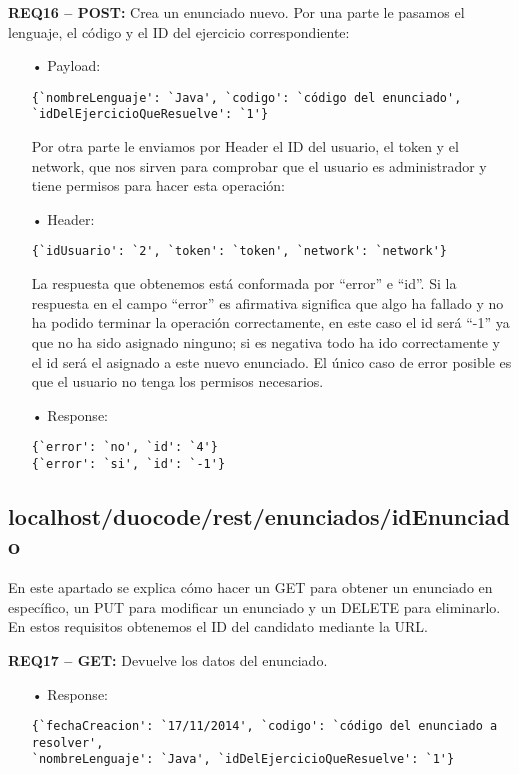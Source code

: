 \textbf{REQ16 – POST:} Crea un enunciado nuevo. Por una parte le pasamos el lenguaje, el código y el ID del ejercicio correspondiente:
\begin{itemize}
\item[•]
Payload: 
{\codesize
\begin{verbatim}
{`nombreLenguaje': `Java', `codigo': `código del enunciado', 
`idDelEjercicioQueResuelve': `1'}
\end{verbatim}
}

Por otra parte le enviamos por Header el ID del usuario, el token y el network, que nos sirven para comprobar que el usuario es administrador y tiene permisos para hacer esta operación:
\item[•]
Header:
{\codesize
\begin{verbatim} 
{`idUsuario': `2', `token': `token', `network': `network'}
\end{verbatim}
}

La respuesta que obtenemos está conformada por ``error'' e ``id''. Si la respuesta en el campo ``error'' es afirmativa significa que algo ha fallado y no ha podido terminar la operación correctamente, en este caso el id será ``-1'' ya que no ha sido asignado ninguno; si es negativa todo ha ido correctamente y el id será el asignado a este nuevo enunciado. El único caso de error posible es que el usuario no tenga los permisos necesarios.
\item[•]
Response: 
{\codesize
\begin{verbatim}
{`error': `no', `id': `4'} 
{`error': `si', `id': `-1'} 
\end{verbatim}
}
\end{itemize}

\subsection{localhost/duocode/rest/enunciados/idEnunciado}
En este apartado se explica cómo hacer un GET para obtener un enunciado en específico, un PUT para modificar un enunciado y un DELETE para eliminarlo.
En estos requisitos obtenemos el ID del candidato mediante la URL.

\textbf{REQ17 – GET:} Devuelve los datos del enunciado.
\begin{itemize}
\item[•]
Response: 
{\codesize
\begin{verbatim}
{`fechaCreacion': `17/11/2014', `codigo': `código del enunciado a resolver', 
`nombreLenguaje': `Java', `idDelEjercicioQueResuelve': `1'}
\end{verbatim}
}
\end{itemize}

